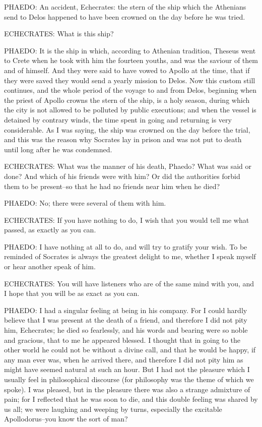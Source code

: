 PHAEDO: An accident, Echecrates: the stern of the ship which the
Athenians send to Delos happened to have been crowned on the day before
he was tried.

ECHECRATES: What is this ship?

PHAEDO: It is the ship in which, according to Athenian tradition,
Theseus went to Crete when he took with him the fourteen youths, and was
the saviour of them and of himself. And they were said to have vowed
to Apollo at the time, that if they were saved they would send a yearly
mission to Delos. Now this custom still continues, and the whole period
of the voyage to and from Delos, beginning when the priest of Apollo
crowns the stern of the ship, is a holy season, during which the city is
not allowed to be polluted by public executions; and when the vessel
is detained by contrary winds, the time spent in going and returning
is very considerable. As I was saying, the ship was crowned on the day
before the trial, and this was the reason why Socrates lay in prison and
was not put to death until long after he was condemned.

ECHECRATES: What was the manner of his death, Phaedo? What was said or
done? And which of his friends were with him? Or did the authorities
forbid them to be present--so that he had no friends near him when he
died?

PHAEDO: No; there were several of them with him.

ECHECRATES: If you have nothing to do, I wish that you would tell me
what passed, as exactly as you can.

PHAEDO: I have nothing at all to do, and will try to gratify your wish.
To be reminded of Socrates is always the greatest delight to me, whether
I speak myself or hear another speak of him.

ECHECRATES: You will have listeners who are of the same mind with you,
and I hope that you will be as exact as you can.

PHAEDO: I had a singular feeling at being in his company. For I
could hardly believe that I was present at the death of a friend, and
therefore I did not pity him, Echecrates; he died so fearlessly, and
his words and bearing were so noble and gracious, that to me he appeared
blessed. I thought that in going to the other world he could not be
without a divine call, and that he would be happy, if any man ever was,
when he arrived there, and therefore I did not pity him as might have
seemed natural at such an hour. But I had not the pleasure which I
usually feel in philosophical discourse (for philosophy was the theme
of which we spoke). I was pleased, but in the pleasure there was also a
strange admixture of pain; for I reflected that he was soon to die, and
this double feeling was shared by us all; we were laughing and weeping
by turns, especially the excitable Apollodorus--you know the sort of
man?

